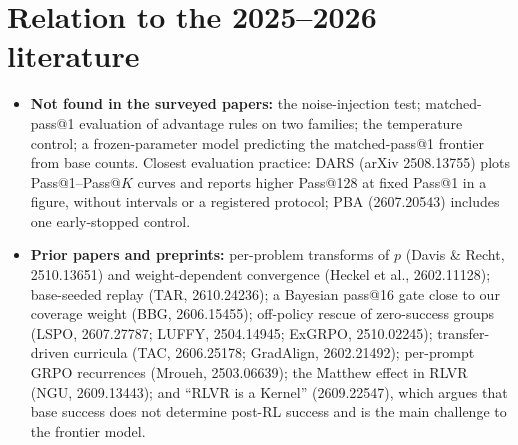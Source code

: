 \documentclass[10pt]{article}
\begin{document}
\section{Relation to the 2025--2026 literature}
\begin{itemize}
\item \textbf{Not found in the surveyed papers:} the noise-injection test; matched-pass@1 evaluation of advantage rules on two families; the temperature control; a frozen-parameter model predicting the matched-pass@1 frontier from base counts. Closest evaluation practice: DARS (arXiv 2508.13755) plots Pass@1--Pass@$K$ curves and reports higher Pass@128 at fixed Pass@1 in a figure, without intervals or a registered protocol; PBA (2607.20543) includes one early-stopped control.
\item \textbf{Prior papers and preprints:} per-problem transforms of $p$ (Davis \& Recht, 2510.13651) and weight-dependent convergence (Heckel et al., 2602.11128); base-seeded replay (TAR, 2610.24236); a Bayesian pass@16 gate close to our coverage weight (BBG, 2606.15455); off-policy rescue of zero-success groups (LSPO, 2607.27787; LUFFY, 2504.14945; ExGRPO, 2510.02245); transfer-driven curricula (TAC, 2606.25178; GradAlign, 2602.21492); per-prompt GRPO recurrences (Mroueh, 2503.06639); the Matthew effect in RLVR (NGU, 2609.13443); and ``RLVR is a Kernel'' (2609.22547), which argues that base success does not determine post-RL success and is the main challenge to the frontier model.
\end{itemize}
\end{document}
